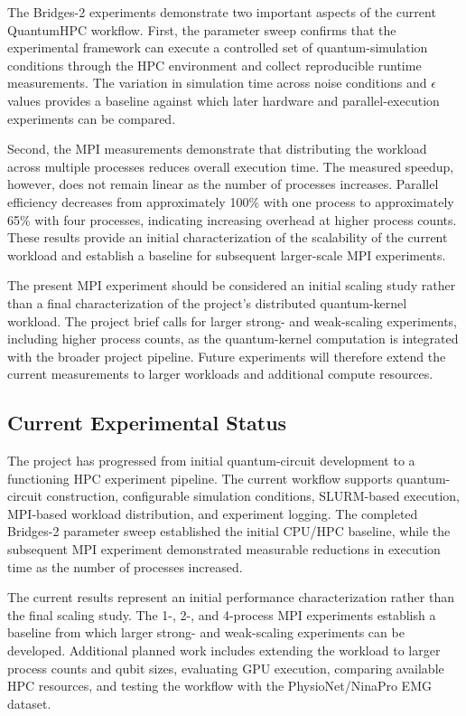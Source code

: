 \documentclass[pdflatex,sn-mathphys-num]{sn-jnl}%
\theoremstyle{thmstyleone}%
\theoremstyle{thmstyletwo}%
\theoremstyle{thmstylethree}%
\begin{document}
The Bridges-2 experiments demonstrate two important aspects of the current QuantumHPC workflow. First, the parameter sweep confirms that the experimental framework can execute a controlled set of quantum-simulation conditions through the HPC environment and collect reproducible runtime measurements. The variation in simulation time across noise conditions and $\epsilon$ values provides a baseline against which later hardware and parallel-execution experiments can be compared.

Second, the MPI measurements demonstrate that distributing the workload across multiple processes reduces overall execution time. The measured speedup, however, does not remain linear as the number of processes increases. Parallel efficiency decreases from approximately 100\% with one process to approximately 65\% with four processes, indicating increasing overhead at higher process counts. These results provide an initial characterization of the scalability of the current workload and establish a baseline for subsequent larger-scale MPI experiments.

The present MPI experiment should be considered an initial scaling study rather than a final characterization of the project's distributed quantum-kernel workload. The project brief calls for larger strong- and weak-scaling experiments, including higher process counts, as the quantum-kernel computation is integrated with the broader project pipeline. Future experiments will therefore extend the current measurements to larger workloads and additional compute resources.

\subsection{Current Experimental Status}\label{subsec:current-status}

The project has progressed from initial quantum-circuit development to a functioning HPC experiment pipeline. The current workflow supports quantum-circuit construction, configurable simulation conditions, SLURM-based execution, MPI-based workload distribution, and experiment logging. The completed Bridges-2 parameter sweep established the initial CPU/HPC baseline, while the subsequent MPI experiment demonstrated measurable reductions in execution time as the number of processes increased.

The current results represent an initial performance characterization rather than the final scaling study. The 1-, 2-, and 4-process MPI experiments establish a baseline from which larger strong- and weak-scaling experiments can be developed. Additional planned work includes extending the workload to larger process counts and qubit sizes, evaluating GPU execution, comparing available HPC resources, and testing the workflow with the PhysioNet/NinaPro EMG dataset.
\end{document}
